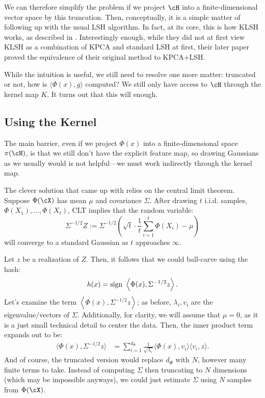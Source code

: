 \documentclass[twoside,11pt]{homework}
\begin{document}
\begin{multicols}{2}
We can therefore simplify the problem if we project $\cH$ into a finite-dimensional vector space by this truncation. Then, conceptually, it is a simple matter of following up with the usual LSH algorithm. In fact, at its core, this is how KLSH works, as described in \cite{K2012}. Interestingly enough, while they did not at first view KLSH as a combination of KPCA and standard LSH at first, their later paper \cite{J2015} proved the equivalence of their original method to KPCA+LSH.

While the intuition is useful, we still need to resolve one more matter: truncated or not, how is $\langle \Phi(x), g\rangle$ computed? We still only have access to $\cH$ through the kernel map $K$. It turns out that this will enough.

\subsection{Using the Kernel}

The main barrier, even if we project $\Phi(x)$ into a finite-dimensional space $\pi(\cH)$, is that we still don't have the explicit feature map, so drawing Gaussians as we usually would is not helpful---we must work indirectly through the kernel map.

The clever solution that \cite{K2012} came up with relies on the central limit theorem. Suppose $\Phi(\cX)$ has mean $\mu$ and covariance $\Sigma$. After drawing $t$ i.i.d. samples, $\Phi(X_1),\dotsc, \Phi(X_t)$, CLT implies that the random variable:
\[\Sigma^{-1/2} Z := \Sigma^{-1/2} \left(\sqrt{t} \cdot \frac{1}{t} \sum_{i=1}^t \Phi(X_i) - \mu\right)\]
will converge to a standard Gaussian as $t$ approaches $\infty$.

Let $z$ be a realization of $Z$. Then, it follows that we could ball-carve using the hash:
\[h(x) = \operatorname{sign} \ \left\langle \Phi(x), \Sigma^{-1/2}z\right\rangle.\]
Let's examine the term $\left\langle \Phi(x), \Sigma^{-1/2}z\right\rangle$; as before, $\lambda_i, v_i$ are the eigenvalue/vectors of $\Sigma$. Additionally, for clarity, we will assume that $\mu = 0$, as it is a just small technical detail to center the data. Then, the inner product term expands out to be:
\begin{align*}
  \langle \Phi(x), \Sigma^{-1/2} z\rangle &= \sum_{i=1}^{d_\Phi} \frac{1}{\sqrt{\lambda_i}} \langle \Phi(x), v_i\rangle \langle v_i , z\rangle.
\end{align*}
And of course, the truncated version would replace $d_\Phi$ with $N$, however many finite terms to take. Instead of computing $\Sigma$ then truncating to $N$ dimensions (which may be impossible anyways), we could just estimate $\Sigma$ using $N$ samples from $\Phi(\cX)$.


\end{multicols}
\end{document}
